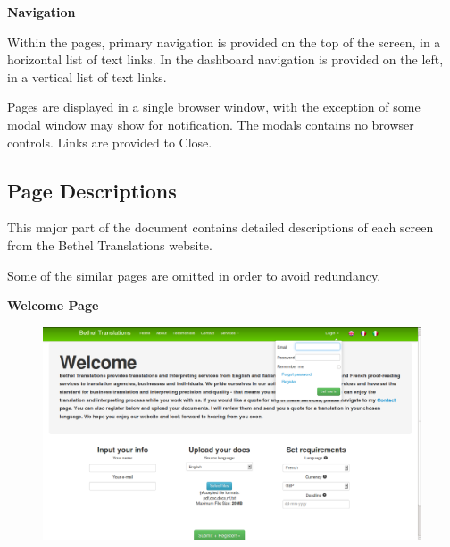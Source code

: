 \documentclass{l3proj}
\begin{document}
\textbf{Navigation}

Within the pages, primary navigation is provided on the top of the
screen, in a horizontal list of text links. In the dashboard navigation is
provided on the left, in a vertical list of text links.

Pages are displayed in a single browser window, with the exception
of some modal window may show for notification. The modals
contains no browser controls. Links are provided to Close.

\subsection{Page Descriptions}

This major part of the document contains detailed descriptions of
each screen from the Bethel Translations website.

Some of the similar pages are omitted in order to avoid redundancy.

\textbf{Welcome Page}
\begin{figure}[H]
\centering
\includegraphics[width=0.8\linewidth]{images/welcomePage}
\vspace{-30pt}
\end{figure}
\end{document}
